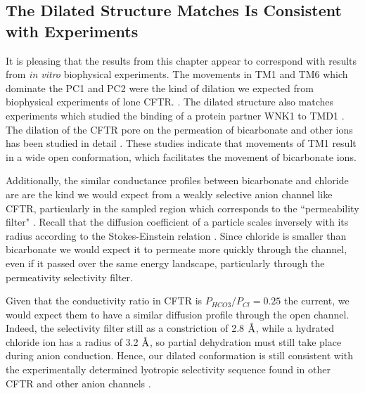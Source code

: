 

\subsection{The Dilated Structure Matches Is Consistent with Experiments}
It is pleasing that the results from this chapter appear to correspond with results from \textit{in vitro} biophysical experiments. The movements in TM1 and TM6 which dominate the PC1 and PC2 were the kind of dilation we expected from biophysical experiments of lone CFTR. \cite{negoda2019,linsdell2016}. The dilated structure also matches experiments which studied the binding of a protein partner WNK1 to TMD1 \cite{kim2019}. The dilation of the CFTR pore on the permeation of bicarbonate and other ions has been studied in detail \cite{jun2016, kim2019}. These studies indicate that movements of TM1 result in a wide open conformation, which facilitates the movement of bicarbonate ions.  

Additionally, the similar conductance profiles between bicarbonate and chloride are are the kind we would expect from a weakly selective anion channel like CFTR, particularly in the sampled region which corresponds to the ``permeability filter" \cite{linsdell2016}. Recall that the diffusion coefficient of a particle scales inversely with its radius according to the Stokes-Einstein relation \cite{miller1924}. Since chloride is smaller than bicarbonate we would expect it to permeate more quickly through the channel, even if it passed over the same energy landscape, particularly through the permeativity selectivity filter. 

Given that the conductivity ratio in CFTR is $P_{HCO3}/P_{Cl}=0.25$ the current, we would expect them to have a similar diffusion profile through the open channel. Indeed, the selectivity filter still as a constriction of 2.8 $\textup{\AA}$, while a hydrated chloride ion has a radius of 3.2 $\textup{\AA}$, so partial dehydration must still take place during anion conduction. Hence, our dilated conformation is still consistent with the experimentally determined lyotropic selectivity sequence found in other CFTR and other anion channels \cite{linsdell2016}. 

